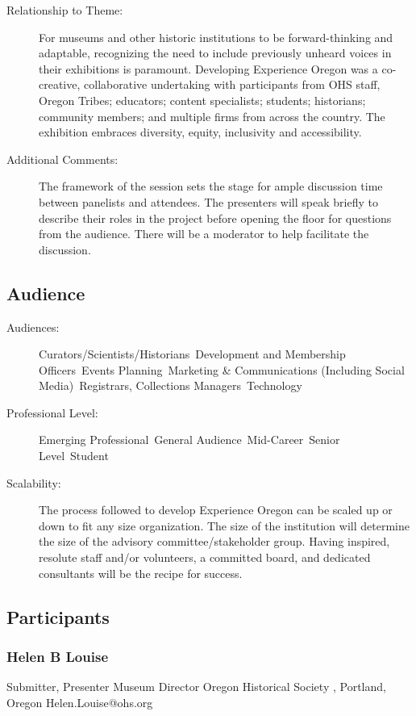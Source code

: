 \documentclass{report}
\begin{document}
\begin{description}
							    \item [Relationship to Theme:]For museums and other historic institutions to be forward-thinking and adaptable, recognizing the need to include previously unheard voices in their exhibitions is paramount. Developing Experience Oregon was a co-creative, collaborative undertaking with participants from OHS staff, Oregon Tribes; educators; content specialists; students; historians; community members; and multiple firms from across the country. The exhibition embraces diversity, equity, inclusivity and accessibility.
							    
                    \item [Additional Comments: ]The framework of the session sets the stage for ample discussion time between panelists and attendees. The presenters will speak briefly to describe their roles in the project before opening the floor for questions from the audience. There will be a moderator to help facilitate the discussion. 

                \end{description}
              \subsection*{Audience}
                \begin{description}
                  \item [Audiences:]Curators/Scientists/Historians~Development and Membership Officers~Events Planning~Marketing \& Communications (Including Social Media)~Registrars, Collections Managers~Technology~
                  \item[Professional Level:]Emerging Professional~General Audience~Mid-Career~Senior Level~Student~
                \item[Scalability:] The process followed to develop Experience Oregon can be scaled up or down to fit any size organization. The size of the institution will determine the size of the advisory committee/stakeholder group. Having inspired, resolute staff and/or volunteers, a committed board, and dedicated consultants will be the recipe for success.

							
              \end{description}
            \subsection*{Participants}
              \subsubsection*{ Helen B Louise  }
              Submitter, Presenter\newline
              Museum Director \newline
              Oregon Historical Society , Portland, Oregon
              \newline
              Helen.Louise@ohs.org\newline
              
\end{document}
